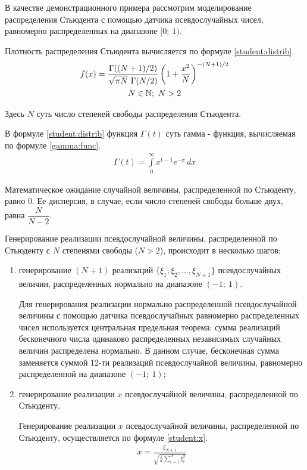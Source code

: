 
В качестве демонстрационного примера рассмотрим моделирование распределения Стьюдента с помощью датчика псевдослучайных чисел, равномерно распределенных на диапазоне $[0 ;~ 1)$.

Плотность распределения Стьюдента вычисляется по формуле \eqref{student:distrib}.
\begin{gather}
	f(x) = \frac{\Gamma((N + 1) / 2)}{\sqrt{\pi N} ~ \Gamma(N / 2)} \left( 1 + \frac{x^2}{N} \right) ^{- (N + 1) / 2} \label{student:distrib} \\
	N \in \mathbb{N} ;~ N > 2 \notag 
\end{gather}

Здесь $N$ суть число степеней свободы распределения Стьюдента. 

В формуле \eqref{student:distrib} функция $\Gamma(t)$ суть гамма - функция, вычисляемая по формуле \eqref{gamma:func}.
\begin{gather}
	\Gamma(t) = \int \limits_0^{\infty} x^{t - 1} e^{-x} \, dx \label{gamma:func}
\end{gather}

Математическое ожидание случайной величины, распределенной по Стьюденту, равно 0. Ее дисперсия, в случае, если число степеней свободы больше двух, равна $\dfrac{N}{N - 2}$.

Генерирование реализации псевдослучайной величины, распределенной по Стьюденту с $N$ степенями свободы ($N > 2$), происходит в несколько шагов:

\begin{enumerate}

	\item генерирование $(N + 1)$ реализаций $\{\xi_1, \xi_2, ..., \xi_{N + 1}\}$ псевдослучайных величин, распределенных нормально на диапазоне \linebreak $(-1 ;~ 1)$.

	Для генерирования реализации нормально распределенной псевдослучайной величины с помощью датчика псевдослучайных равномерно распределенных чисел используется центральная предельная теорема: сумма реализаций бесконечного числа одинаково распределенных независимых случайных величин распределена нормально. В данном случае, бесконечная сумма заменяется суммой 12-ти реализаций псевдослучайной величины, равномерно распределенной на диапазоне $(-1 ;~ 1)$;
	
	\item генерирование реализации $x$ псевдослучайной величины, распределенной по Стьюденту.

	Генерирование реализации $x$ псевдослучайной величины, распределенной по Стьюденту, осуществляется по формуле \eqref{student:x}.
	\begin{gather}
		x = \frac{\xi_{N + 1}}{\sqrt{\frac{1}{n}\sum \limits_{i = 1}^N \xi_i^2}} \label{student:x}
	\end{gather}

\end{enumerate}

